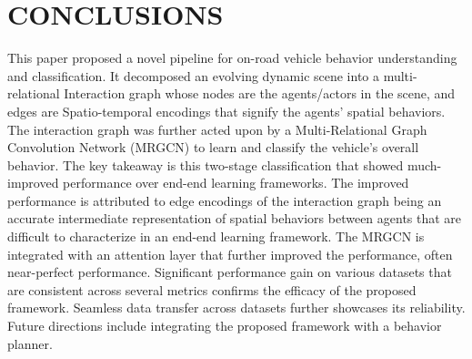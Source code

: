\documentclass[letterpaper, 10 pt, conference]{ieeeconf}
\begin{document}
\section{CONCLUSIONS}
This paper proposed a novel pipeline for on-road vehicle behavior understanding and classification. It decomposed an evolving dynamic scene into a multi-relational Interaction graph whose nodes are the agents/actors in the scene, and edges are Spatio-temporal encodings that signify the agents' spatial behaviors. The interaction graph was further acted upon by a Multi-Relational Graph Convolution Network (MRGCN) to learn and classify the vehicle's overall behavior. The key takeaway is this two-stage classification that showed much-improved performance over end-end learning frameworks. The improved performance is attributed to edge encodings of the interaction graph being an accurate intermediate representation of spatial behaviors between agents that are difficult to characterize in an end-end learning framework. The MRGCN is integrated with an attention layer that further improved the performance, often near-perfect performance. Significant performance gain on various datasets that are consistent across several metrics confirms the efficacy of the proposed framework. Seamless data transfer across datasets further showcases its reliability. Future directions include integrating the proposed framework with a behavior planner.
\end{document}
